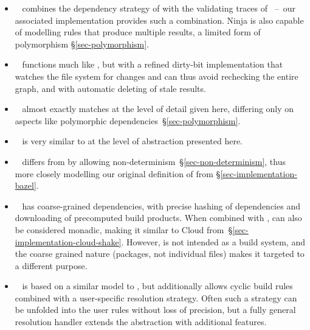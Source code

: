 \begin{itemize}
\item \Ninja~\cite{ninja} combines the dependency strategy of \Make with the
validating traces of \Shake~--~our associated implementation provides such a
combination. Ninja is also capable of modelling rules that produce multiple
results, a limited form of polymorphism \S\ref{sec-polymorphism}.

\item \Tup~\cite{tup} functions much like \Make, but with a refined dirty-bit
implementation that watches the file system for changes and can thus avoid
rechecking the entire graph, and with automatic deleting of stale results.

\item \Redo~\cite{redo} almost exactly matches \Shake at the level of detail
given here, differing only on aspects like polymorphic
dependencies~\S\ref{sec-polymorphism}.

\item \Buck~\cite{buck} is very similar to \Bazel at the level of abstraction presented here.

\item \CloudBuild~\cite{esfahani2016cloudbuild}
differs from \Bazel by allowing non-determinism~\S\ref{sec-non-determinism}, thus more closely modelling
our original definition of \Bazel from \S\ref{sec-implementation-bazel}.

\item \Nix~\cite{dolstra2004nix} has coarse-grained dependencies, with precise
hashing of dependencies and downloading of precomputed build products. When
combined with , \Nix can also be considered monadic,
making it similar to Cloud \Shake from~\S\ref{sec-implementation-cloud-shake}.
However, \Nix is not intended as a build system, and the coarse grained nature
(packages, not individual files) makes it targeted to a different purpose.

\item \Pluto~\cite{erdweg2015pluto} is based on a similar model to \Shake, but
additionally allows cyclic build rules combined with a user-specific resolution
strategy. Often such a strategy can be unfolded into the user rules without loss
of precision, but a fully general resolution handler extends the 
abstraction with additional features.
\end{itemize}

